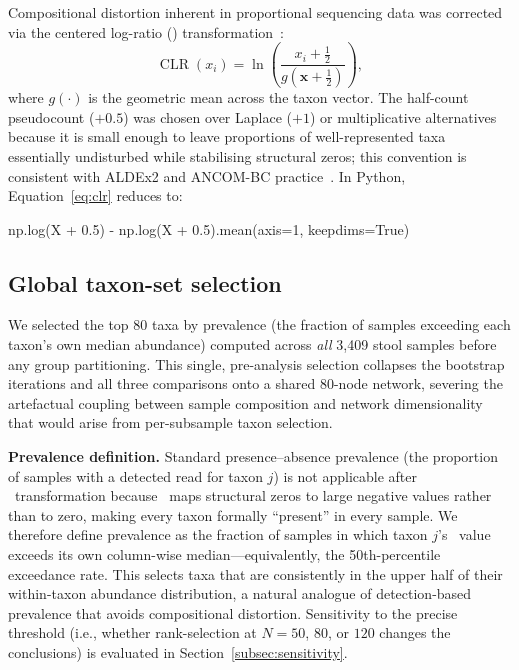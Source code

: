 Compositional distortion inherent in proportional sequencing data was
corrected via the centered log-ratio (\clr) transformation~\citep{aitchison1982statistical,
gloor2017microbiome}:
\begin{equation}
  \operatorname{CLR}(x_i)
    = \ln\!\left(\frac{x_i + \tfrac{1}{2}}{g(\mathbf{x} + \tfrac{1}{2})}\right),
  \label{eq:clr}
\end{equation}
where $g(\cdot)$ is the geometric mean across the taxon vector.
The half-count pseudocount ($+0.5$) was chosen over Laplace ($+1$) or
multiplicative alternatives because it is small enough to leave
proportions of well-represented taxa essentially undisturbed while
stabilising structural zeros; this convention is consistent with ALDEx2
and ANCOM-BC practice~\citep{gloor2017microbiome}.
In Python, Equation~\ref{eq:clr} reduces to:
\begin{center}\small\ttfamily
np.log(X + 0.5) - np.log(X + 0.5).mean(axis=1, keepdims=True)
\end{center}

\subsection{Global taxon-set selection}
\label{subsec:taxa_selection}

We selected the top 80 taxa by prevalence (the fraction of samples exceeding
each taxon's own median abundance) computed across \emph{all} 3,409 stool
samples before any group partitioning.
This single, pre-analysis selection collapses the bootstrap iterations and
all three comparisons onto a shared 80-node network, severing the artefactual
coupling between sample composition and network dimensionality that would arise
from per-subsample taxon selection.

\textbf{Prevalence definition.}
Standard presence--absence prevalence (the proportion of samples with a
detected read for taxon $j$) is not applicable after \clr\ transformation
because \clr\ maps structural zeros to large negative values rather than to
zero, making every taxon formally ``present'' in every sample.
We therefore define prevalence as the fraction of samples in which taxon $j$'s
\clr\ value exceeds its own column-wise median---equivalently, the 50th-percentile
exceedance rate.
This selects taxa that are consistently in the upper half of their within-taxon
abundance distribution, a natural analogue of detection-based prevalence that
avoids compositional distortion.
Sensitivity to the precise threshold (i.e., whether rank-selection at $N = 50$,
$80$, or $120$ changes the conclusions) is evaluated in
Section~\ref{subsec:sensitivity}.

